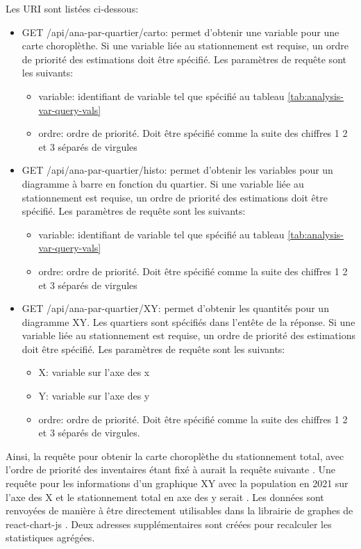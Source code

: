 Les \ac{URI} sont listées ci-dessous:
\begin{itemize}
    \item GET /api/ana-par-quartier/carto: permet d'obtenir une variable pour une carte choroplèthe. Si une variable liée au stationnement est requise, un ordre de priorité des estimations doit être spécifié. Les paramètres de requête sont les suivants:
    \begin{itemize}
        \item variable: identifiant de variable tel que spécifié au tableau \ref{tab:analysis-var-query-vals}
        \item ordre: ordre de priorité. Doit être spécifié comme la suite des chiffres 1 2 et 3 séparés de virgules
    \end{itemize}
    \item GET /api/ana-par-quartier/histo: permet d'obtenir les variables pour un diagramme à barre en fonction du quartier. Si une variable liée au stationnement est requise, un ordre de priorité des estimations doit être spécifié. Les paramètres de requête sont les suivants:
    \begin{itemize}
        \item variable: identifiant de variable tel que spécifié au tableau \ref{tab:analysis-var-query-vals}
        \item ordre: ordre de priorité. Doit être spécifié comme la suite des chiffres 1 2 et 3 séparés de virgules
    \end{itemize}
    \item GET /api/ana-par-quartier/XY: permet d'obtenir les quantités pour un diagramme XY. Les quartiers sont spécifiés dans l'entête de la réponse. Si une variable liée au stationnement est requise, un ordre de priorité des estimations doit être spécifié. Les paramètres de requête sont les suivants:
    \begin{itemize}
        \item X: variable sur l'axe des x
        \item Y: variable sur l'axe des y
        \item ordre: ordre de priorité. Doit être spécifié comme la suite des chiffres 1 2 et 3 séparés de virgules.
    \end{itemize}
\end{itemize}
Ainsi, la requête pour obtenir la carte choroplèthe du stationnement total, avec l'ordre de priorité des inventaires étant fixé à  \fg{}  aurait la requête suivante \fg{}. Une requête pour les informations d'un graphique XY avec la population en 2021 sur l'axe des X et le stationnement total en axe des y serait  \fg{}. Les données sont renvoyées de manière à être directement utilisables dans la librairie de graphes de react-chart-js \parencite{ayerst_react-chartjs-2_2017}. Deux adresses supplémentaires sont créées pour recalculer les statistiques agrégées.
